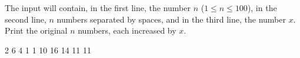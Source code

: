 




The input will contain, in the first line, the number $n$ ($1\leq n\leq 100$), in the second line, $n$ numbers separated by spaces, and in the third line, the number $x$. Print the original $n$ numbers, each increased by $x$.

2 6 4 1 1
10
 16 14 11 11
\koniec


